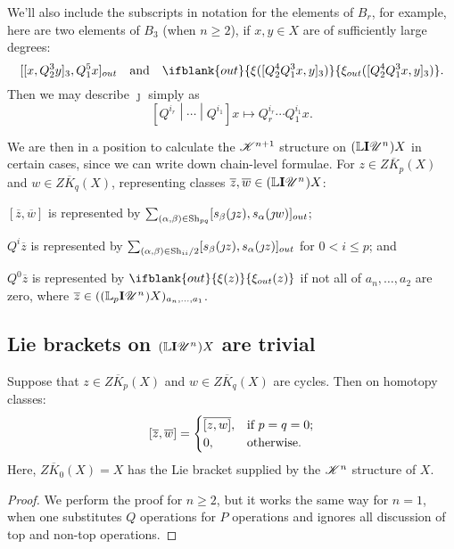 \documentclass[11pt]{article}
\newcommand{\LL}[1]{{\scrK}^{#1}}%
\newcommand{\nontop}[1]{\scrU^{#1}}%
\newcommand{\Ind}[2][]{\mathbf{I}{#2}_{#1}}%
\newcommand{\Fr}[2][]{\ifblank{#1}{#2}{#2_{#1}}}
\newcommand{\restn}[2][]{\ifblank{#1}{\xi{#2}}{\xi_{#1}{#2}}}%
\newcommand{\derived}{\mathbb{L}}
\renewcommand{\Q}{Q}
\newcommand{\Shuffles}[2]{\textup{Sh}_{#1#2}}
\newcommand{\HalfShuffles}[2]{\textup{Sh}_{#1#2}/2}
\begin{document}
\begin{LieLambdaStructureOnKoszul}
We'll also include the subscripts in notation for the elements of $B_r$, for example, here are two elements of $B_3$ (when $n\geq2$), if $x,y\in X$ are of sufficiently large degrees:
\[[[x,\Q^3_2y]_3,\Q^5_1x]_{out}\textup{\quad and\quad }\restn[out]{([\Q^4_2\Q^3_1x,y]_3)}.\]
Then we may describe $\jmath$ simply as
\[\left[\Q^{i_{r}} \middle|\cdots\middle|\Q^{i_{1}} \right]x\mapsto\Q^{i_{r}}_r\cdots \Q^{i_{1}}_1x.\]


We are then in a position to calculate the $\LL{n+1}$ structure on $(\derived\Ind{\nontop{n}})X$ in certain cases, since we can write down chain-level formulae. For $z\in Z\overline{K}_p(X)$ and $w\in Z\overline{K}_q(X)$, representing classes $\overline{z},\overline{w}\in(\derived\Ind{\nontop{n}})X$:
\begin{itemise}
\setlength{\parindent}{.25in}
\item $[\overline{z},\overline{w}]$ is represented by $\sum_{(\alpha,\beta)\in\Shuffles{p}{q}}[s_\beta(\jmath z), s_\alpha(\jmath w)]_{out}$;
\item $Q^i\overline{z}$ is represented by $\sum_{(\alpha,\beta)\in\HalfShuffles{i}{i}}[s_\beta(\jmath z), s_\alpha(\jmath z)]_{out}$ for $0<i\leq p$; and
\item $Q^0\overline{z}$ is represented by $\restn[out]{(z)}$ if not all of $a_n,\ldots,a_2$ are zero, where $\overline{z}\in((\derived_{p}\Ind{\nontop{n}})X)_{a_n,\ldots,a_1}$.
\end{itemise}
\subsection{Lie brackets on $(\derived\Ind{\nontop{n}})X$ are trivial}
\begin{prop*}
Suppose that $z\in Z\overline{K}_p(X)$ and $w\in Z\overline{K}_q(X)$ are cycles. Then on homotopy classes:%
\[[\overline{z},\overline{w}]=\begin{cases}
\overline{[z,w]},&\textup{if }p=q=0;\\
0,&\textup{otherwise}.
\end{cases}
\]
Here, $Z\overline{K}_0(X)=X$ has the Lie bracket supplied by the $\LL{n}$ structure of $X$.
\end{prop*}
\begin{proof}
We perform the proof for $n\geq2$, but it works the same way for $n=1$, when one substitutes $\Q$ operations for $P$ operations and ignores all discussion of top and non-top operations.


\end{proof}
\end{LieLambdaStructureOnKoszul}
\end{document}
